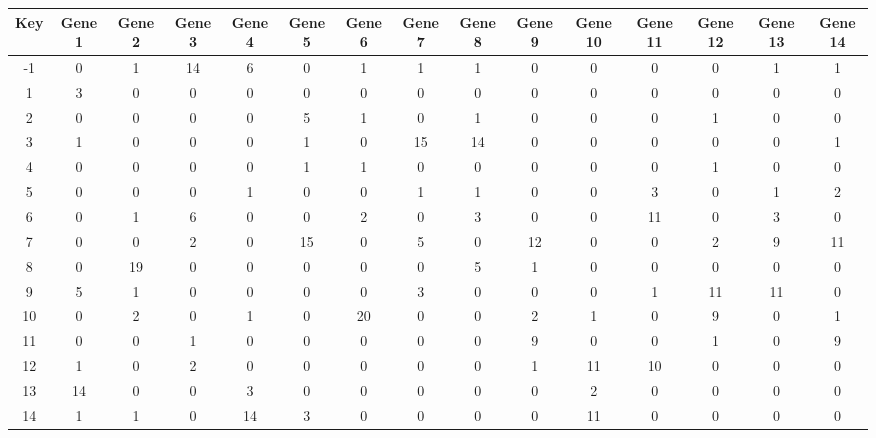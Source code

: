 \begin{tabular}{|c|c|c|c|c|c|c|c|c|c|c|c|c|c|c|}
\hline
Key & Gene 1 & Gene 2 & Gene 3 & Gene 4 & Gene 5 & Gene 6 & Gene 7 & Gene 8 & Gene 9 & Gene 10 & Gene 11 & Gene 12 & Gene 13 & Gene 14 \\
\hline
-1 & 0 & 1 & 14 & 6 & 0 & 1 & 1 & 1 & 0 & 0 & 0 & 0 & 1 & 1 \\
1 & 3 & 0 & 0 & 0 & 0 & 0 & 0 & 0 & 0 & 0 & 0 & 0 & 0 & 0 \\
2 & 0 & 0 & 0 & 0 & 5 & 1 & 0 & 1 & 0 & 0 & 0 & 1 & 0 & 0 \\
3 & 1 & 0 & 0 & 0 & 1 & 0 & 15 & 14 & 0 & 0 & 0 & 0 & 0 & 1 \\
4 & 0 & 0 & 0 & 0 & 1 & 1 & 0 & 0 & 0 & 0 & 0 & 1 & 0 & 0 \\
5 & 0 & 0 & 0 & 1 & 0 & 0 & 1 & 1 & 0 & 0 & 3 & 0 & 1 & 2 \\
6 & 0 & 1 & 6 & 0 & 0 & 2 & 0 & 3 & 0 & 0 & 11 & 0 & 3 & 0 \\
7 & 0 & 0 & 2 & 0 & 15 & 0 & 5 & 0 & 12 & 0 & 0 & 2 & 9 & 11 \\
8 & 0 & 19 & 0 & 0 & 0 & 0 & 0 & 5 & 1 & 0 & 0 & 0 & 0 & 0 \\
9 & 5 & 1 & 0 & 0 & 0 & 0 & 3 & 0 & 0 & 0 & 1 & 11 & 11 & 0 \\
10 & 0 & 2 & 0 & 1 & 0 & 20 & 0 & 0 & 2 & 1 & 0 & 9 & 0 & 1 \\
11 & 0 & 0 & 1 & 0 & 0 & 0 & 0 & 0 & 9 & 0 & 0 & 1 & 0 & 9 \\
12 & 1 & 0 & 2 & 0 & 0 & 0 & 0 & 0 & 1 & 11 & 10 & 0 & 0 & 0 \\
13 & 14 & 0 & 0 & 3 & 0 & 0 & 0 & 0 & 0 & 2 & 0 & 0 & 0 & 0 \\
14 & 1 & 1 & 0 & 14 & 3 & 0 & 0 & 0 & 0 & 11 & 0 & 0 & 0 & 0 \\
\hline
\end{tabular}